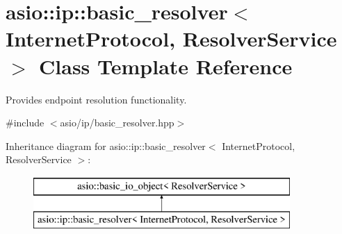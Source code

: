 \hypertarget{classasio_1_1ip_1_1basic__resolver}{}\section{asio\+:\+:ip\+:\+:basic\+\_\+resolver$<$ Internet\+Protocol, Resolver\+Service $>$ Class Template Reference}
\label{classasio_1_1ip_1_1basic__resolver}


Provides endpoint resolution functionality.  




{\ttfamily \#include $<$asio/ip/basic\+\_\+resolver.\+hpp$>$}

Inheritance diagram for asio\+:\+:ip\+:\+:basic\+\_\+resolver$<$ Internet\+Protocol, Resolver\+Service $>$\+:\begin{figure}[H]
\begin{center}
\leavevmode
\includegraphics[height=2.000000cm]{classasio_1_1ip_1_1basic__resolver}
\end{center}
\end{figure}
